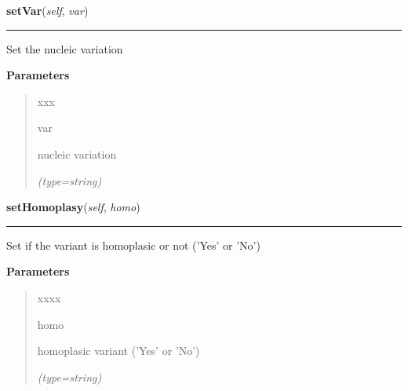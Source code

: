 \hspace{.8\funcindent}\begin{boxedminipage}{\funcwidth}

    \raggedright \textbf{setVar}(\textit{self}, \textit{var})

    \vspace{-1.5ex}

    \rule{\textwidth}{0.5\fboxrule}
\setlength{\parskip}{2ex}
    Set the nucleic variation

\setlength{\parskip}{1ex}
      \textbf{Parameters}
      \vspace{-1ex}

      \begin{quote}
        \begin{Ventry}{xxx}

          \item[var]

          nucleic variation

            {\it (type=string)}

        \end{Ventry}

      \end{quote}

    \end{boxedminipage}

    \label{script-phyloFixedVar:var:setHomoplasy}

    \vspace{0.5ex}

\hspace{.8\funcindent}\begin{boxedminipage}{\funcwidth}

    \raggedright \textbf{setHomoplasy}(\textit{self}, \textit{homo})

    \vspace{-1.5ex}

    \rule{\textwidth}{0.5\fboxrule}
\setlength{\parskip}{2ex}
    Set if the variant is homoplasic or not ('Yes' or 'No')

\setlength{\parskip}{1ex}
      \textbf{Parameters}
      \vspace{-1ex}

      \begin{quote}
        \begin{Ventry}{xxxx}

          \item[homo]

          homoplasic variant ('Yes' or 'No')

            {\it (type=string)}

        \end{Ventry}

      \end{quote}

    \end{boxedminipage}

